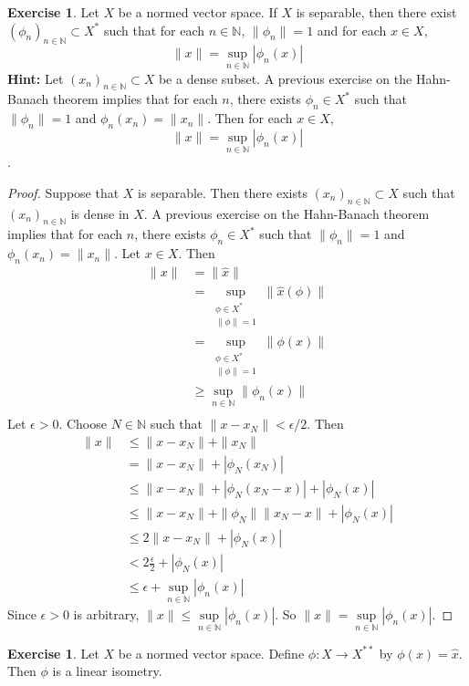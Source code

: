 \documentclass[12pt]{amsart}
\theoremstyle{definition}
\newtheorem{ex}[definition]{Exercise}
\newcommand{\ep}{\epsilon}
\newcommand{\N}{\mathbb{N}}
\newcommand{\lex}[1]{\label{ex:#1}}
\begin{document}
	\begin{ex}
		Let $X$ be a normed vector space. If $X$ is separable, then there exist $(\phi_n)_{n \in \N} \subset X^*$ such that for each $n \in \N$, $\|\phi_n\| = 1$ and for each $x \in X$, 
		$$\|x\| = \sup_{n \in \N} |\phi_n(x)|$$  
		\textbf{Hint:} Let $(x_n)_{n \in \N} \subset X$ be a dense subset. A previous exercise on the Hahn-Banach theorem implies that for each $n$, there exists $\phi_n \in X^*$ such that $\|\phi_n\| = 1$ and $\phi_n(x_n) = \|x_n\|$. Then for each $x \in X$, $$\|x\| = \sup_{n \in \N} |\phi_n(x)|$$. 
	\end{ex}
	
	\begin{proof}
		Suppose that $X$ is separable. Then there exists $(x_n)_{n \in \N} \subset X$ such that $(x_n)_{n \in \N}$ is dense in $X$. A previous exercise on the Hahn-Banach theorem implies that for each $n$, there exists $\phi_n \in X^*$ such that $\|\phi_n\| = 1$ and $\phi_n(x_n) = \|x_n\|$. Let $x \in X$. Then 
		\begin{align*}
			\|x\| 
			&= \|\hat{x}\| \\
			&= \sup_{\substack{\phi \in X^* \\ \|\phi\| = 1}} \|\hat{x}(\phi)\| \\
			&= \sup_{\substack{\phi \in X^* \\ \|\phi\| = 1}} \|\phi(x)\| \\
			& \geq \sup_{n \in \N} \|\phi_n(x)\| \\
		\end{align*}
		Let $\ep > 0$. Choose $N \in \N$ such that $\|x - x_N\| < \ep/2$. Then
		\begin{align*}
			\|x\| 
			& \leq \|x - x_N\| + \|x_N\| \\
			& = \|x - x_N\| + |\phi_N(x_N)| \\
			& \leq \|x - x_N\| + |\phi_N(x_N - x)| + |\phi_N(x)| \\
			& \leq \|x - x_N\| + \|\phi_N\|\|x_N - x\| + |\phi_N(x)| \\
			& \leq 2\|x - x_N\| + |\phi_N(x)| \\
			& < 2 \frac{\ep}{2} +  |\phi_N(x)| \\
			& \leq \ep + \sup_{n \in \N} |\phi_n(x)|
		\end{align*}
		Since $\ep >0$ is arbitrary, $\|x\| \leq \sup\limits_{n \in \N} |\phi_n(x)|$. So $\|x\| = \sup\limits_{n \in \N} |\phi_n(x)|$.
	\end{proof}
	
	
	\begin{ex} \lex{}
		Let $X$ be a normed vector space. Define $\phi : X \rightarrow X^{**}$ by $\phi(x) = \hat{x}$. Then $\phi$ is a linear isometry. 
	\end{ex}
	
\end{document}
